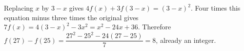 Replacing $x$ by $3-x$ gives $4f(x)+3f(3-x)=(3-x)^2$. Four times this equation minus three times the original gives $7f(x)=4(3-x)^2-3x^2=x^2-24x+36$. Therefore $f(27)-f(25)=\dfrac{27^2-25^2-24(27-25)}{7}=\boxed8$, already an integer.
